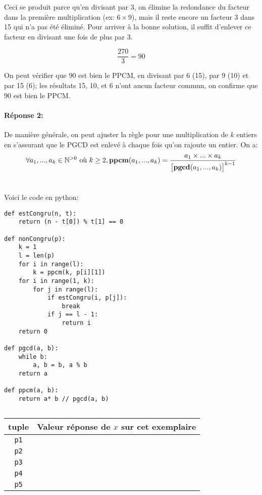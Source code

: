 \documentclass{article}
\newcommand{\key}[1]{{\bf #1}}
\begin{document}
Ceci se produit parce qu'en divisant par 3, on élimine la redondance du facteur dans la première multiplication (ex: $6 \times 9$), mais il reste encore un facteur 3 dans 15 qui n'a pas été éliminé. Pour arriver à la bonne solution, il suffit d'enlever ce facteur en divisant une fois de plus par 3.

$$\frac{270}{3} = 90$$

On peut vérifier que 90 est bien le PPCM, en divisant par 6 (15), par 9 (10) et par 15 (6); les résultats 15, 10, et 6 n'ont aucun facteur commun, on confirme que 90 est bien le PPCM.

\paragraph{Réponse 2:}
De manière générale, on peut ajuster la règle pour une multiplication de $k$ entiers en s'assurant que le PGCD est enlevé à chaque fois qu'on rajoute un entier. On a:
\begin{equation}
  \forall a_1,...,a_k \in \mathbb{N}^{>0} \text{ où }k \geq 2, \key{ppcm}(a_1,...,a_k)=
  \frac{a_1 \times ... \times a_k}{\big[\key{pgcd}(a_1,...,a_k)\big]^{k-1}}
\end{equation}
\section{}
\subsection{}
Voici le code en python:
\begin{lstlisting}
def estCongru(n, t):
	return (n - t[0]) % t[1] == 0

def nonCongru(p):
	k = 1
	l = len(p)
	for i in range(l):
		k = ppcm(k, p[i][1])
	for i in range(1, k):
		for j in range(l):
			if estCongru(i, p[j]):
				break
			if j == l - 1:
				return i
	return 0		

def pgcd(a, b):
	while b:
		a, b = b, a % b
	return a

def ppcm(a, b):
	return a* b // pgcd(a, b)
\end{lstlisting}
\subsection{}
\begin{center}
\begin{tabular}{|c|c|}
  tuple & Valeur réponse de $x$ sur cet exemplaire\\
  \hline
  \texttt{p1} & \hspace{10cm} \\
  \texttt{p2} & \\
  \texttt{p3} & \\
  \texttt{p4} & \\
  \texttt{p5} & \\
  \hline
\end{tabular}
\end{center}
\end{document}
